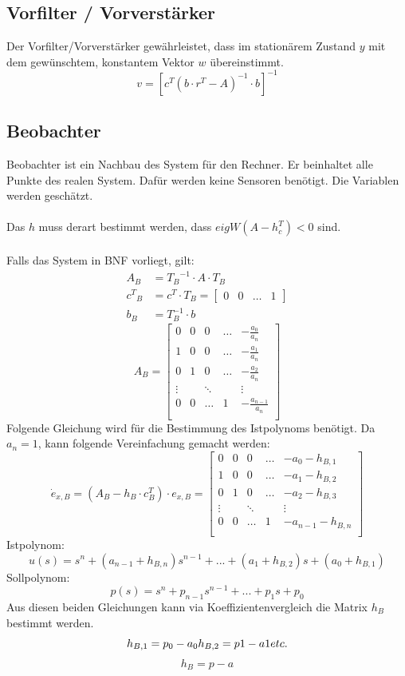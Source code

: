 \subsection{Vorfilter / Vorverstärker}
Der Vorfilter/Vorverstärker gewährleistet, dass im stationärem Zustand $y$ mit dem gewünschtem, konstantem Vektor $w$ übereinstimmt.
\[
	 	v=[c^T(b\cdot r^T-A)^{-1}\cdot b]^{-1}
\]
\subsection{Beobachter}
Beobachter ist ein Nachbau des System für den Rechner. Er beinhaltet alle Punkte des realen System. Dafür werden keine Sensoren benötigt. Die Variablen werden geschätzt.\\
\\
Das $h$ muss derart bestimmt werden, dass $eigW(A-h_c^T)<0$ sind.\\
\\
Falls das System in BNF vorliegt, gilt:
\[\begin{aligned}
	A_B &= {T_B}^{-1}\cdot A \cdot T_B	\\	
	{c^T}_B &= c^T\cdot T_B = \begin{bmatrix}
		0 & 0 & \ldots & 1
	\end{bmatrix}	\\	
	b_B &= T_B^{-1}\cdot b
\end{aligned}\]
\[
	A_B= \begin{bmatrix}
		0 &	0 & 0 & \ldots & -\frac{a_0}{a_n}\\
		1 & 0 & 0 & \ldots & -\frac{a_1}{a_n}\\
		0 & 1 & 0 & \ldots & -\frac{a_2}{a_n}\\
		\vdots &  & \ddots &  & \vdots \\
		0 & 0 & \ldots & 1 &-\frac{a_{n-1}}{a_n}\\	
	\end{bmatrix}
\]
Folgende Gleichung wird für die Bestimmung des Istpolynoms benötigt. Da $a_n=1$, kann folgende Vereinfachung gemacht werden:
\[
	\dot{e}_{x,B}=(A_B-h_B\cdot c_B^T)\cdot e_{x,B}=
	\begin{bmatrix}
		0 &	0 & 0 & \ldots & -a_0-h_{B,1}\\
		1 & 0 & 0 & \ldots & -a_1-h_{B,2}\\
		0 & 1 & 0 & \ldots & -a_2-h_{B,3}\\
		\vdots &  & \ddots &  & \vdots \\
		0 & 0 & \ldots & 1 &-a_{n-1}-h_{B,n}\\	
	\end{bmatrix}
\]
Istpolynom:
\[
	u(s)=s^n+(a_{n-1}+h_{B,n})s^{n-1}+...+(a_1+h_{B,2})s+(a_0+h_{B,1})
\]
Sollpolynom:
\[
	p(s)=s^n+p_{n-1}s^{n-1}+...+p_1 s+p_0
\]
Aus diesen beiden Gleichungen kann via Koeffizientenvergleich die Matrix $h_B$ bestimmt werden.
\[
	h_{B,1}=p_0-a_0	\\	h_{B,2}=p1-a1	\\	etc.	
\]
\[
	h_B=p-a
\]